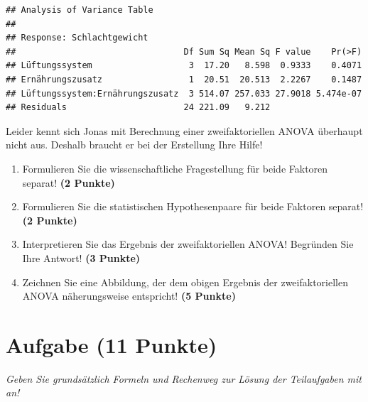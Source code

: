 \documentclass[a4paper, 9pt]{scrartcl}\usepackage[]{graphicx}\usepackage[]{xcolor}
\makeatletter
\newenvironment{kframe}{%
 \def\at@end@of@kframe{}%
 \ifinner\ifhmode%
  \def\at@end@of@kframe{\end{minipage}}%
  \begin{minipage}{\columnwidth}%
 \fi\fi%
 \def\FrameCommand##1{\hskip\@totalleftmargin \hskip-\fboxsep
 \colorbox{shadecolor}{##1}\hskip-\fboxsep
     \hskip-\linewidth \hskip-\@totalleftmargin \hskip\columnwidth}%
 \MakeFramed {\advance\hsize-\width
   \@totalleftmargin\z@ \linewidth\hsize
   \@setminipage}}%
 {\par\unskip\endMakeFramed%
 \at@end@of@kframe}
\newenvironment{knitrout}{}{} %
\makeatother
\begin{document}
\begin{knitrout}
\color{fgcolor}\begin{kframe}
\begin{verbatim}
## Analysis of Variance Table
## 
## Response: Schlachtgewicht
##                                 Df Sum Sq Mean Sq F value    Pr(>F)
## Lüftungssystem                   3  17.20   8.598  0.9333    0.4071
## Ernährungszusatz                 1  20.51  20.513  2.2267    0.1487
## Lüftungssystem:Ernährungszusatz  3 514.07 257.033 27.9018 5.474e-07
## Residuals                       24 221.09   9.212
\end{verbatim}
\end{kframe}
\end{knitrout}

\vspace{1ex}

Leider kennt sich Jonas mit Berechnung einer zweifaktoriellen ANOVA überhaupt nicht aus. Deshalb braucht er bei der Erstellung Ihre Hilfe! 

\begin{enumerate}
  \item Formulieren Sie die wissenschaftliche Fragestellung für beide Faktoren separat! \textbf{(2 Punkte)}
  \item Formulieren Sie die statistischen Hypothesenpaare für beide Faktoren separat! \textbf{(2 Punkte)}
\item Interpretieren Sie das Ergebnis der zweifaktoriellen ANOVA! Begründen Sie Ihre Antwort! \textbf{(3 Punkte)} 
\item Zeichnen Sie eine Abbildung, der dem obigen Ergebnis der
  zweifaktoriellen ANOVA näherungsweise entspricht! \textbf{(5 Punkte)}
\end{enumerate}
 
\clearpage

\section{Aufgabe \hfill (11 Punkte)}

\textit{Geben Sie grundsätzlich Formeln und Rechenweg zur Lösung der Teilaufgaben mit an!} \\[1Ex]
 
\end{document}
